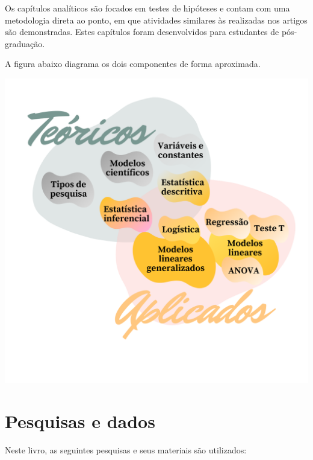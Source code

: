 \documentclass[
]{book}
\begin{document}
Os capítulos analíticos são focados em testes de hipóteses e contam com uma metodologia direta ao ponto, em que atividades similares às realizadas nos artigos são demonstradas. Estes capítulos foram desenvolvidos para estudantes de pós-graduação.

A figura abaixo diagrama os dois componentes de forma aproximada.

\includegraphics{./img/proposta.png}

\hypertarget{pesquisas-e-dados}{%
\section{Pesquisas e dados}\label{pesquisas-e-dados}}

Neste livro, as seguintes pesquisas e seus materiais são utilizados:
\end{document}
